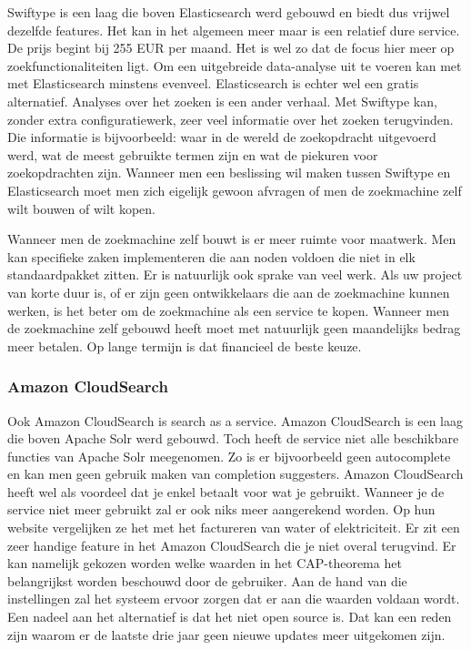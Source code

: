 Swiftype is een laag die boven Elasticsearch werd gebouwd en biedt dus vrijwel dezelfde features. Het kan in het algemeen meer maar is een relatief dure service. De prijs begint bij 255 EUR per maand. Het is wel zo dat de focus hier meer op zoekfunctionaliteiten ligt. Om een uitgebreide data-analyse uit te voeren kan met met Elasticsearch minstens evenveel. Elasticsearch is echter wel een gratis alternatief. Analyses over het zoeken is een ander verhaal. Met Swiftype kan, zonder extra configuratiewerk, zeer veel informatie over het zoeken terugvinden. Die informatie is bijvoorbeeld: waar in de wereld de zoekopdracht uitgevoerd werd, wat de meest gebruikte termen zijn en wat de piekuren voor zoekopdrachten zijn. Wanneer men een beslissing wil maken tussen Swiftype en Elasticsearch  moet men zich eigelijk gewoon afvragen of men de zoekmachine zelf wilt bouwen of wilt kopen.

Wanneer men de zoekmachine zelf bouwt is er meer ruimte voor maatwerk. Men kan specifieke zaken implementeren die aan noden voldoen die niet in elk standaardpakket zitten. Er is natuurlijk ook sprake van veel werk. Als uw project van korte duur is, of er zijn geen ontwikkelaars die aan de zoekmachine kunnen werken, is het beter om de zoekmachine als een service te kopen. Wanneer men de zoekmachine zelf gebouwd heeft moet met natuurlijk geen maandelijks bedrag meer betalen. Op lange termijn is dat financieel de beste keuze.

\subsubsection{Amazon CloudSearch}

Ook Amazon CloudSearch is search as a service. Amazon CloudSearch is een laag die boven Apache Solr werd gebouwd. Toch heeft de service niet alle beschikbare functies van Apache Solr meegenomen. Zo is er bijvoorbeeld geen autocomplete en kan men geen gebruik maken van completion suggesters. Amazon CloudSearch heeft wel als voordeel dat je enkel betaalt voor wat je gebruikt. Wanneer je de service niet meer gebruikt zal er ook niks meer aangerekend worden. Op hun website vergelijken ze het met het factureren van water of elektriciteit. Er zit een zeer handige feature in het Amazon CloudSearch die je niet overal terugvind. Er kan namelijk gekozen worden welke waarden in het CAP-theorema het belangrijkst worden beschouwd door de gebruiker. Aan de hand van die instellingen zal het systeem ervoor zorgen dat er aan die waarden voldaan wordt. Een nadeel aan het alternatief is dat het niet open source is. Dat kan een reden zijn waarom er de laatste drie jaar geen nieuwe updates meer uitgekomen zijn.

